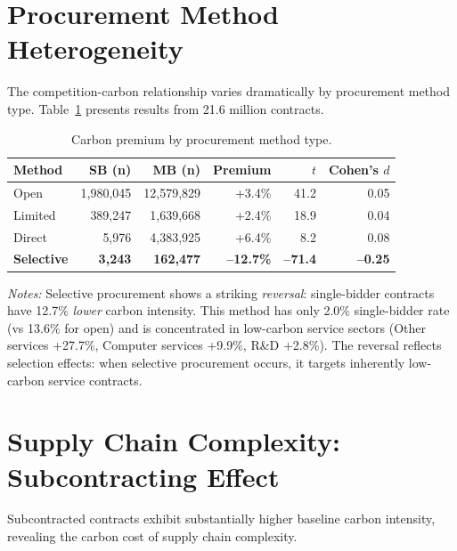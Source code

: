 \documentclass[11pt]{article}
\newcommand{\tabnoteblock}[1]{%
    \par\vspace{0.45em}%
    \begin{minipage}{0.98\linewidth}
    \footnotesize\raggedright #1
    \end{minipage}\par
}
\newcommand{\tabnotes}[1]{\tabnoteblock{\textit{Notes:} #1}}
\begin{document}
\section{Procurement Method Heterogeneity}

The competition-carbon relationship varies dramatically by procurement method type. Table~\ref{tab:procurement_method} presents results from 21.6 million contracts.

\begin{table}[H]
\centering
\caption{Carbon premium by procurement method type.}
\label{tab:procurement_method}
\begin{tabular}{lrrrrr}
\toprule
\textbf{Method} & \textbf{SB (n)} & \textbf{MB (n)} & \textbf{Premium} & \textbf{$t$} & \textbf{Cohen's $d$} \\
\midrule
Open & 1,980,045 & 12,579,829 & +3.4\% & 41.2 & 0.05 \\
Limited & 389,247 & 1,639,668 & +2.4\% & 18.9 & 0.04 \\
Direct & 5,976 & 4,383,925 & +6.4\% & 8.2 & 0.08 \\
\textbf{Selective} & \textbf{3,243} & \textbf{162,477} & \textbf{--12.7\%} & \textbf{--71.4} & \textbf{--0.25} \\
\bottomrule
\end{tabular}

\tabnotes{Selective procurement shows a striking \textit{reversal}: single-bidder contracts have 12.7\% \textit{lower} carbon intensity. This method has only 2.0\% single-bidder rate (vs 13.6\% for open) and is concentrated in low-carbon service sectors (Other services +27.7\%, Computer services +9.9\%, R\&D +2.8\%). The reversal reflects selection effects: when selective procurement occurs, it targets inherently low-carbon service contracts.
}
\end{table}

\section{Supply Chain Complexity: Subcontracting Effect}

Subcontracted contracts exhibit substantially higher baseline carbon intensity, revealing the carbon cost of supply chain complexity.
\end{document}
